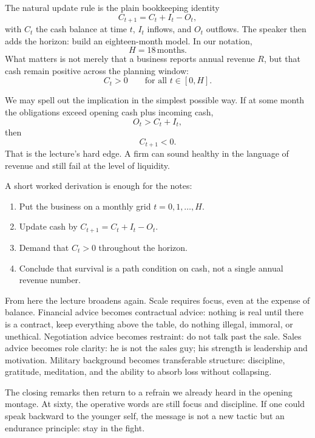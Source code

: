 The natural update rule is the plain bookkeeping identity
\begin{equation}
C_{t+1} = C_t + I_t - O_t,
\end{equation}
with $C_t$ the cash balance at time $t$, $I_t$ inflows, and $O_t$ outflows. The speaker then adds the horizon: build an eighteen-month model. In our notation,
\begin{equation}
H = 18\,\mathrm{months}.
\end{equation}
What matters is not merely that a business reports annual revenue $R$, but that cash remain positive across the planning window:
\begin{equation}
C_t > 0 \qquad \text{for all } t \in [0,H].
\end{equation}

We may spell out the implication in the simplest possible way. If at some month the obligations exceed opening cash plus incoming cash,
\begin{equation}
O_t > C_t + I_t,
\end{equation}
then
\begin{equation}
C_{t+1} < 0.
\end{equation}
That is the lecture's hard edge. A firm can sound healthy in the language of revenue and still fail at the level of liquidity.

A short worked derivation is enough for the notes:
\begin{enumerate}
\item Put the business on a monthly grid $t=0,1,\dots,H$.
\item Update cash by $C_{t+1}=C_t+I_t-O_t$.
\item Demand that $C_t>0$ throughout the horizon.
\item Conclude that survival is a path condition on cash, not a single annual revenue number.
\end{enumerate}

From here the lecture broadens again. Scale requires focus, even at the expense of balance. Financial advice becomes contractual advice: nothing is real until there is a contract, keep everything above the table, do nothing illegal, immoral, or unethical. Negotiation advice becomes restraint: do not talk past the sale. Sales advice becomes role clarity: he is not the sales guy; his strength is leadership and motivation. Military background becomes transferable structure: discipline, gratitude, meditation, and the ability to absorb loss without collapsing.

The closing remarks then return to a refrain we already heard in the opening montage. At sixty, the operative words are still focus and discipline. If one could speak backward to the younger self, the message is not a new tactic but an endurance principle: stay in the fight.

